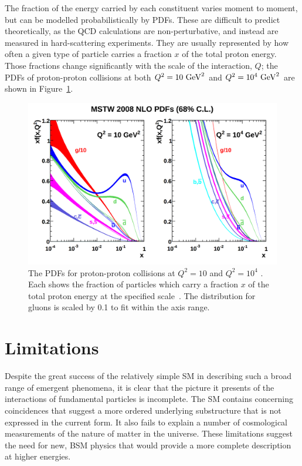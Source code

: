 The fraction of the energy carried by each constituent varies moment to moment, but can be modelled probabilistically by \acp{PDF}.
These are difficult to predict theoretically, as the \ac{QCD} calculations are non-perturbative, and instead are measured in hard-scattering experiments.
They are usually represented by how often a given type of particle carries a fraction $x$ of the total proton energy.
Those fractions change significantly with the scale of the interaction, $Q$; the \acp{PDF} of proton-proton collisions at both $Q^2 = 10\ \mathrm{Ge\kern -0.05em V}^{2}$ and $Q^2 = 10^4\ \mathrm{Ge\kern -0.05em V}^{2}$ are shown in Figure~\ref{fig:pdfs}.

\begin{figure}
\includegraphics[width=\textwidth]{figures/pdfs.png}
\caption{The \acp{PDF} for proton-proton collisions at $Q^2 = 10$ \GeV{} and $Q^2 = 10^4$ \GeV{}. Each shows the fraction of particles which carry a fraction $x$ of the total proton energy at the specified scale~\cite{pdfs}. The distribution for gluons is scaled by 0.1 to fit within the axis range.}
\label{fig:pdfs}
\end{figure}

\section{Limitations}
\label{sec:limitations}

Despite the great success of the relatively simple \ac{SM} in describing such a broad range of emergent phenomena, it is clear that the picture it presents of the interactions of fundamental particles is incomplete.
The \ac{SM} contains concerning coincidences that suggest a more ordered underlying substructure that is not expressed in the current form.
It also fails to explain a number of cosmological measurements of the nature of matter in the universe.
These limitations suggest the need for new, \ac{BSM} physics that would provide a more complete description at higher energies.



